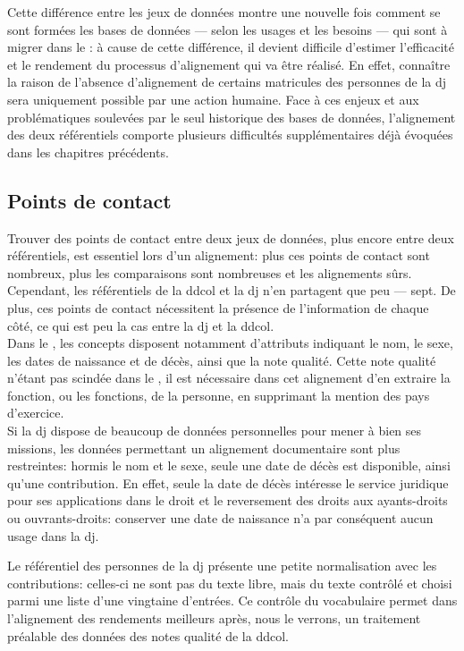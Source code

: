 Cette différence entre les jeux de données montre une nouvelle fois comment se sont formées les bases de données --- selon les usages et les besoins --- qui sont à migrer dans le \ldd: à cause de cette différence, il devient difficile d'estimer l'efficacité et le rendement du processus d'alignement qui va être réalisé. En effet, connaître la raison de l'absence d'alignement de certains matricules des personnes de la \ac{dj} sera uniquement possible par une action humaine. Face à ces enjeux et aux problématiques soulevées par le seul historique des bases de données, l'alignement des deux référentiels comporte plusieurs difficultés supplémentaires déjà évoquées dans les chapitres précédents.

\subsection{\label{III-C-1-b}Points de contact}

Trouver des points de contact entre deux jeux de données, plus encore entre deux référentiels, est essentiel lors d'un alignement: plus ces points de contact sont nombreux, plus les comparaisons sont nombreuses et les alignements sûrs. Cependant, les référentiels de la \ac{ddcol} et la \ac{dj} n'en partagent que peu --- sept. De plus, ces points de contact nécessitent la présence de l'information de chaque côté, ce qui est peu la cas entre la \ac{dj} et la \ac{ddcol}.\\

Dans le \ldd, les concepts disposent notamment d'attributs indiquant le nom, le sexe, les dates de naissance et de décès, ainsi que la note qualité. Cette note qualité n'étant pas scindée dans le \ldd, il est nécessaire dans cet alignement d'en extraire la fonction, ou les fonctions, de la personne, en supprimant la mention des pays d'exercice.\\

Si la \ac{dj} dispose de beaucoup de données personnelles pour mener à bien ses missions, les données permettant un alignement documentaire sont plus restreintes: hormis le nom et le sexe, seule une date de décès est disponible, ainsi qu'une contribution. En effet, seule la date de décès intéresse le service juridique pour ses applications dans le droit et le reversement des droits aux ayants-droits ou ouvrants-droits: conserver une date de naissance n'a par conséquent aucun usage dans la \ac{dj}.

\noindent Le référentiel des personnes de la \ac{dj} présente une petite normalisation avec les contributions: celles-ci ne sont pas du texte libre, mais du texte contrôlé et choisi parmi une liste d'une vingtaine d'entrées. Ce contrôle du vocabulaire permet dans l'alignement des rendements meilleurs après, nous le verrons, un traitement préalable des données des notes qualité de la \ac{ddcol}.\\

